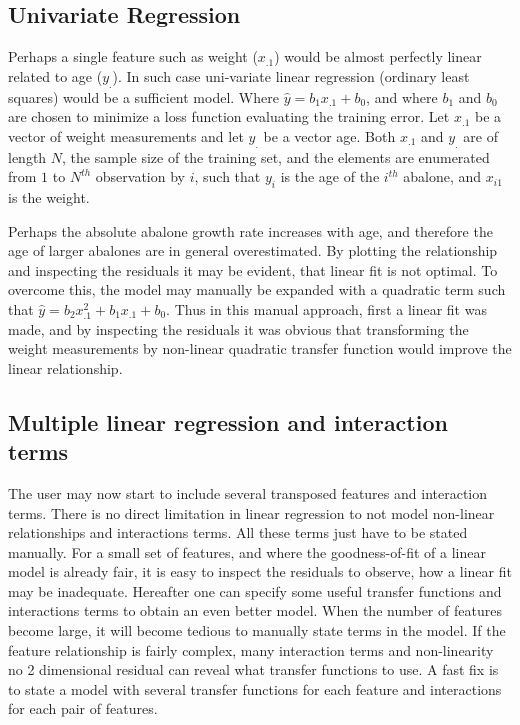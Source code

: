 \subsection{Univariate Regression}
Perhaps a single feature such as weight ($x_{.1}$) would be almost perfectly linear related to age ($y_.$). In such case uni-variate linear regression (ordinary least squares) would be a sufficient model. Where $\hat{y} = b_1 x_{.1} + b_0$, and where $b_1$ and $b_0$ are chosen to minimize a loss function evaluating the training error. Let $x_{.1}$ be a vector of weight measurements and let $y_.$ be a vector age. Both $x_.1$ and $y_.$ are of length $N$, the sample size of the training set, and the elements are enumerated from $1$ to $N^{th}$ observation by $i$, such that $y_i$ is the age of the $i^{th}$ abalone, and $x_{i1}$ is the weight.

Perhaps the absolute abalone growth rate increases with age, and therefore the age of larger abalones are in general overestimated. By plotting the relationship and inspecting the residuals it may be evident, that linear fit is not optimal. To overcome this, the model may manually be expanded with a quadratic term such that $\hat{y} = b_2 x_{.1}^2 + b_1 x_{.1} + b_0$.  Thus in this manual approach, first a linear fit was made, and by inspecting the residuals it was obvious that transforming the weight measurements by non-linear quadratic transfer function would improve the linear relationship.

\subsection{Multiple linear regression and interaction terms}
The user may now start to include several transposed features and interaction terms. There is no direct limitation in linear regression to not model non-linear relationships and interactions terms. All these terms just have to be stated manually. For a small set of features, and where the goodness-of-fit of a linear model is already fair, it is easy to inspect the residuals to observe, how a linear fit may be inadequate. Hereafter one can specify some useful transfer functions and interactions terms to obtain an even better model. When the number of features become large, it will become tedious to manually state terms in the model. If the feature relationship is fairly complex, many interaction terms and non-linearity no 2 dimensional residual can reveal what transfer functions to use. A fast fix is to state a model with several transfer functions for each feature and interactions for each pair of features.

